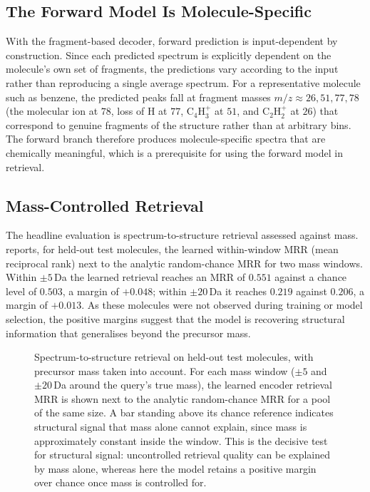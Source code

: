 \subsection{The Forward Model Is Molecule-Specific}
\label{sec:molecule-specific}

With the fragment-based decoder, forward prediction is input-dependent by construction.
Since each predicted spectrum is explicitly dependent on the molecule's own set of fragments, the predictions vary according to the input rather than reproducing a single average spectrum.
For a representative molecule such as benzene, the predicted peaks fall at fragment masses $m/z \approx 26, 51, 77, 78$ (the molecular ion at $78$, loss of H at $77$, $\mathrm{C_4H_3^+}$ at $51$, and $\mathrm{C_2H_2^+}$ at $26$) that correspond to genuine fragments of the structure rather than at arbitrary bins.
The forward branch therefore produces molecule-specific spectra that are chemically meaningful, which is a prerequisite for using the forward model in retrieval.

\subsection{Mass-Controlled Retrieval}

The headline evaluation is spectrum-to-structure retrieval assessed against mass.
 reports, for held-out test molecules, the learned within-window MRR (mean reciprocal rank) next to the analytic random-chance MRR for two mass windows.
Within $\pm 5$\,Da the learned retrieval reaches an MRR of $0.551$ against a chance level of $0.503$, a margin of $+0.048$; within $\pm 20$\,Da it reaches $0.219$ against $0.206$, a margin of $+0.013$.
As these molecules were not observed during training or model selection, the positive margins suggest that the model is recovering structural information that generalises beyond the precursor mass.

\begin{figure}[H]
    \centering
    \caption[Mass-controlled retrieval: learned vs.\ chance]{
        Spectrum-to-structure retrieval on held-out test molecules, with precursor mass taken into account.
        For each mass window ($\pm 5$ and $\pm 20$\,Da around the query's true mass), the learned encoder retrieval MRR is shown next to the analytic random-chance MRR for a pool of the same size.
        A bar standing above its chance reference indicates structural signal that mass alone cannot explain, since mass is approximately constant inside the window.
        This is the decisive test for structural signal: uncontrolled retrieval quality can be explained by mass alone, whereas here the model retains a positive margin over chance once mass is controlled for.
    }
    \label{fig:mass-controlled}
\end{figure}

